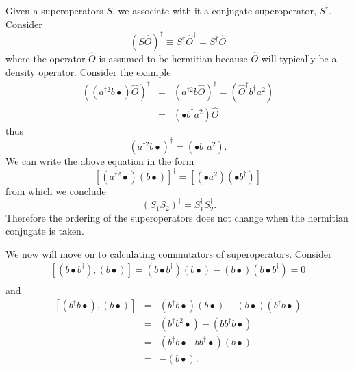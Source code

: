 Given a superoperators $S$, we associate with it a conjugate superoperator, $S^{\dagger}$. Consider
\begin{equation}
\left( S \hat{O} \right)^{\dagger} \equiv S^{\dagger} \hat{O}^{\dagger} = S^{\dagger} \hat{O}
\end{equation}
where the operator $\hat{O}$ is assumed to be hermitian because $\hat{O}$ will typically be a density operator. Consider the example
\begin{eqnarray}
\left( \left( a^{\dagger 2 } b \bullet \right) \hat{O} \right)^{\dagger} & = & \left( a^{\dagger 2 } b \hat{O} \right)^{\dagger} = \left( \hat{O}^{\dagger} b^{\dagger} a^{2} \right) \nonumber \\
& = & \left( \bullet b^{\dagger} a^{2} \right) \hat{O}
\end{eqnarray}
thus
\begin{equation}
\left( a^{\dagger 2 } b \bullet \right)^{\dagger} = \left( \bullet b^{\dagger} a^2 \right).
\end{equation} 
We can write the above equation in the form
\begin{equation}
\left[ \left( a^{\dagger 2 } \bullet \right) \left( b \bullet \right) \right]^{\dagger} = \left[ \left( \bullet a^2 \right) \left( \bullet b^{\dagger} \right) \right]
\end{equation}
from which we conclude
\begin{equation}\
\left( S_1 S_2 \right)^{\dagger} = S_1^{\dagger} S_2^{\dagger}.
\end{equation}
Therefore the ordering of the superoperators does not change when the hermitian conjugate is taken.

We now will move on to calculating commutators of superoperators. Consider
\begin{eqnarray}
\left[ \left( b \bullet b^{\dagger} \right) , \left( b \bullet \right) \right] =  \left( b \bullet b^{\dagger} \right) \left( b  \bullet \right) - \left( b \bullet \right) \left( b \bullet b^{\dagger} \right) = 0  \nonumber \\
\end{eqnarray}
and
\begin{eqnarray}
\left[ \left( b^{\dagger} b \bullet \right) , \left( b \bullet \right) \right] & = & \left( b^{\dagger} b \bullet \right)\left( b \bullet \right) - \left( b \bullet \right) \left( b^{\dagger} b \bullet \right) \nonumber \\
& = & \left( b^{\dagger} b^2 \bullet \right) - \left( b b^{\dagger} b \bullet \right) \nonumber \\
& = & \left( b^{\dagger} b \bullet - b b^{\dagger} \bullet \right) \left( b \bullet \right) \nonumber \\ 
& = & - \left( b \bullet \right). \nonumber 
\end{eqnarray}

